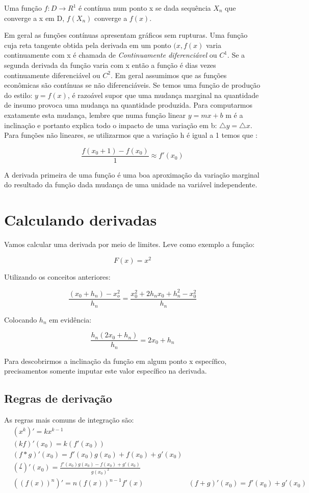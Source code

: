 \documentclass[12pt,a4paper,oneside,brazil]{abntex2}
\begin{document}
Uma função $ f: D \rightarrow R^1$ é contínua num ponto x se dada sequência ${X_n}$ que converge a x em D, $ f (X_n)$ converge a $ f (x)$. \newline

Em geral as funções contínuas apresentam gráficos sem rupturas. Uma função cuja reta tangente obtida pela derivada em um ponto $(x, f (x)$ varia continuamente com x é chamada de \emph{Continuamente diferenciável} ou \textbf{$C^1$}. Se a segunda derivada da função varia com x então a função é dias vezes continuamente diferenciável ou \textbf{$C^2$}. Em geral assumimos que as funções econômicas são contínuas se não diferenciáveis. Se temos uma função de produção do estilo: $y = f (x)$, é razoável supor que uma mudança marginal na quantidade de insumo provoca uma mudança na quantidade produzida. Para computarmos exatamente esta mudança, lembre que numa função linear $ y = m x + b$ m é a inclinação e portanto explica todo o impacto de uma variação em b: $\triangle y = \triangle x$. Para funções não lineares, se utilizarmos que a variação h é igual a 1 temos que :

\[ \frac{f (x_0 + 1) - f (x_0)}{1} \approx f'(x_0) \]

A derivada primeira de uma função é uma boa aproximação da variação marginal do resultado da função dada mudança de uma unidade na variável independente.

\section{Calculando derivadas}
Vamos calcular uma derivada por meio de limites. Leve como exemplo a função:

\[  F (x) = x^2 \]

Utilizando os conceitos anteriores:

\[ \frac{ (x_0 + h_n) - x_o^2}{h_n} = \frac{x_0^2 + 2 h _n x_0 + h_n^2 -x_0^2}{h_n} \]

Colocando $h_n$ em evidência:

\[ \frac{h_n (2 x_0 + h_n)}{h_n} = 2 x_0 + h_n \]

Para descobrirmos a inclinação da função em algum ponto x específico, precisamentos somente imputar este valor específico na derivada.

\subsection{Regras de derivação}

As regras mais comuns de integração são:
\begin{align}
& (x^k)'= k x^{k - 1}\\
& (k f)'(x_0) = k (f'(x_0))\\
& (f * g)'(x_0) = f'(x_0) g(x_0) + f(x_0) + g'(x_0)\\ 
& (\frac{f}{})' (x_0) = \frac{f'(x_0) g(x_0) - f(x_0) + g'(x_0)}{g (x_0)^2}\\
& ((f (x))^n)'= n (f(x))^{n - 1} f'(x)
& (f + g)' (x_0) = f'(x_0) + g'(x_0)\\ 
\end{align}                

\section{}


\printbibliography
\end{document}
